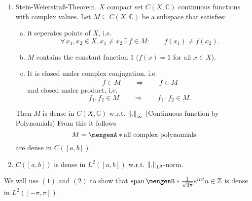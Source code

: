 \begin{enumerate}[(1)]
	\item Stein-Weierstraß-Theorem. $X$ compact set $C(X,\mathbb{C})$ continuous functions with complex values. Let $M \subseteq C(X,\mathbb{C})$ be a subspace that satisfies:
	\begin{enumerate}[(a)]
		\item it seperates points of $X$, i.e. 
		\[
			\forall\, x_1,x_2 \in X, x_1 \neq x_2 \,\exists\, f \in M: \qquad f(x_1) \neq f(x_2).
		\]
		\item $M$ contains the constant function 1 ($f(x)= 1$ for all $x \in X$).
		\item It is closed under complex conjugation, i.e. 
		\[
			f \in M \qquad \Rightarrow \qquad \bar{f} \in M
		\]
		and closed under product, i.e.
		\[
			f_1,f_2 \in M \qquad \Rightarrow \qquad f_1 \cdot f_2 \in M.
		\]
	\end{enumerate}
	Then $M$ is dense in $C(X,\mathbb{C})$ w.r.t. $\norm{.}_{\infty}$ (Continuous function by Polynomials) From this it follows
	\[
		M = \set{ \text{all complex polynomials}}
	\]
	are dense in $C([a,b])$.
	\item $C([a,b])$ is dense in $L^2([a,b])$ w.r.t. $\norm{.}_{L^2}$-norm. 
\end{enumerate}
We will use $(1)$ and $(2)$ to show that $\spn\set[\frac{1}{\sqrt{2 \pi}}e^{int}]{n \in \mathbb{Z}}$ is dense in $L^2([-\pi,\pi])$.
